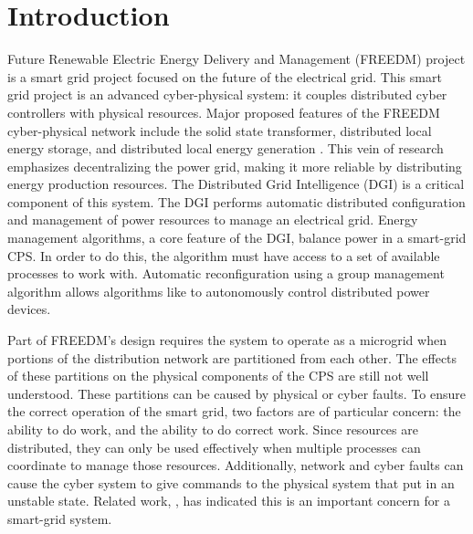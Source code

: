 
\section{Introduction}

 Future Renewable Electric Energy Delivery and Management (FREEDM) project is a smart grid project focused on the future of the electrical grid.
This smart grid project is an advanced cyber-physical system: it couples distributed cyber controllers with physical resources.
Major proposed features of the FREEDM cyber-physical network include the solid state transformer, distributed local energy storage, and distributed local energy generation \cite{FREEDMMIGRATION}.
This vein of research emphasizes decentralizing the power grid, making it more reliable by distributing energy production resources.
The Distributed Grid Intelligence (DGI) is a critical component of this system.
The DGI performs automatic distributed configuration and management of power resources to manage an electrical grid.
Energy management algorithms, a core feature of the DGI\cite{LOADBALANCING}, balance power in a smart-grid CPS.
In order to do this, the algorithm must have access to a set of available processes to work with.
Automatic reconfiguration using a group management algorithm allows algorithms like \cite{LOADBALANCING}\cite{ICC1}\cite{MOYEEN} to autonomously control distributed power devices.

Part of FREEDM's design requires the system to operate as a microgrid when portions of the distribution network are partitioned from each other.
The effects of these partitions on the physical components of the CPS are still not well understood.
These partitions can be caused by physical or cyber faults.
To ensure the correct operation of the smart grid, two factors are of particular concern: the ability to do work, and the ability to do correct work.
Since resources are distributed, they can only be used effectively when multiple processes can coordinate to manage those resources.
Additionally, network and cyber faults can cause the cyber system to give commands to the physical system that put in an unstable state.
Related work, \cite{HARINI}\cite{TSG}\cite{ICC2}\cite{SGNETFAULT}, has indicated this is an important concern for a smart-grid system.

